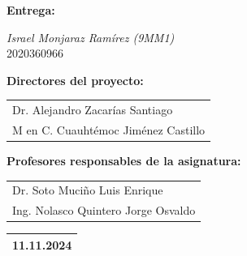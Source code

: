 \documentclass[11pt,a4paper]{article}
\begin{document}
	
	\begin{center}
		\begin{Large}
			\textbf{Entrega:}\\[0.2cm] 
		\end{Large}
		
			{\Large\textit{Israel Monjaraz Ramírez (9MM1)}}\\[0.2cm] 
			2020360966
		
		\begin{Large}
			\textbf{Directores del proyecto:}\\[0.2cm] 
		\end{Large}
		
		
		\begin{tabular}{l}
			Dr.	Alejandro Zacarías Santiago\\
			M en C. Cuauhtémoc Jiménez Castillo\\
		\end{tabular}

		
	\end{center}
	\vspace{0.2cm}
	\begin{center}
		\begin{Large}
			\textbf{Profesores responsables de la asignatura:}\\[0.2cm] 
		\end{Large}
		
		
		\begin{tabular}{l}
			Dr. Soto Muciño Luis Enrique\\
		Ing. Nolasco Quintero Jorge Osvaldo\\
		
		\end{tabular}
		
	\end{center}
	\vspace{0.8cm}
	\begin{flushright}
		\begin{tabular}{|c|}
			\hline
		11.11.2024\\
			\hline
		\end{tabular}
	\end{flushright}
	
	
	
\end{document}
